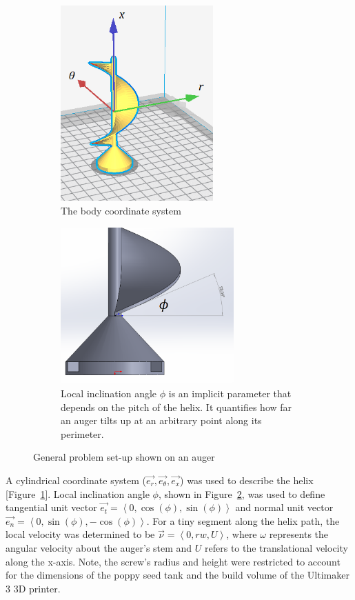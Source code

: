 \documentclass[letterpaper, 11 pt]{article}
\begin{document}
\begin{figure}[H]
\centering
\begin{subfigure}{.5\textwidth}
	\centering
	\includegraphics[height=7.5cm]{./imgs/helix_csys}
	\caption{The body coordinate system}
	\label{fig:helix_csys}
\end{subfigure}%
\begin{subfigure}{.5\textwidth}
	\centering
	\includegraphics[height=6cm]{./imgs/helix_phi}
	\caption{Local inclination angle $\phi$ is an implicit parameter that depends on the pitch of the helix. It quantifies how far an auger tilts up at an arbitrary point along its perimeter.}
	\label{fig:helix_phi}
\end{subfigure}
\caption{General problem set-up shown on an auger}
\label{probSetup}
\end{figure}
 
A cylindrical coordinate system ($\vec{e_r}, \vec{e_\theta}, \vec{e_x}$) was used to describe the helix [Figure~\ref{fig:helix_csys}]. Local inclination angle $\phi$, shown in Figure~\ref{fig:helix_phi}, was used to define tangential unit vector $\vec{e_t} = \left\langle 0, \cos(\phi),\sin(\phi)\right\rangle $ and normal unit vector $\vec{e_n} = \left\langle 0, \sin(\phi), -\cos(\phi)\right\rangle $. For a tiny segment along the helix path, the local velocity was determined to be $\vec{\nu} = \left\langle 0, rw, U\right\rangle $, where $\omega$ represents the angular velocity about the auger's stem and $U$ refers to the translational velocity along the x-axis. Note, the screw's radius and height were restricted to account for the dimensions of the poppy seed tank and the build volume of the Ultimaker 3 3D printer.  
\end{document}
